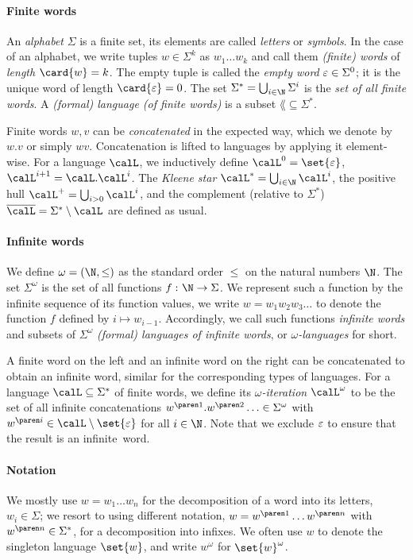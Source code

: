 \documentclass[../../diss.tex]{subfiles}
\begin{document}
\paragraph{Finite words}

An \emph{alphabet} $\Sigma$ is a finite set, its elements are called \emph{letters} or \emph{symbols}.
In the case of an alphabet, we write tuples $w \in \Sigma^k$ as $w_1 \ldots w_k$ and call them \emph{(finite) words} of \emph{length} $\card{w} = k$.
The empty tuple is called the \emph{empty word} $\varepsilon \in \Sigma^0$; it is the unique word of length $\card{\eps} = 0$.
The set $\Sigma^* = \bigcup_{i \in \N} \Sigma^i$ is the \emph{set of all finite words}.
A \emph{(formal) language (of finite words)} is a subset $\lang \subseteq \Sigma^*$.

%
Finite words $w,v$ can be \emph{concatenated} in the expected way, which we denote by $w.v$ or simply $wv$.
Concatenation is lifted to languages by applying it element-wise.
For a language $\calL$, we inductively define $\calL^0 = \set{\eps}$, $\calL^{i+1} = \calL.\calL^{i}$.
The \emph{Kleene star} $\calL^* = \bigcup_{i \in \N} \calL^i$, the positive hull $\calL^+ = \bigcup_{i > 0} \calL^i$, and the complement (relative to $\Sigma^*$) $\overline{\calL} = \Sigma^* \setminus \calL$ are defined as usual.

\paragraph{Infinite words}

We define $\omega = (\N,\leq)$ as the standard order $\leq$ on the natural numbers $\N$.
%
The set $\Sigma^\omega$ is the set of all functions $f \,\colon \N \to \Sigma$.
We represent such a function by the infinite sequence of its function values, \ie we write $w = w_1 w_2 w_3 \ldots$ to denote the function $f$ defined by $i \mapsto w_{i-1}$.
Accordingly, we call such functions \emph{infinite words} and subsets of $\Sigma^\omega$ \emph{(formal) languages of infinite words}, or \emph{$\omega$-languages} for short.

A finite word on the left and an infinite word on the right can be concatenated to obtain an infinite word, similar for the corresponding types of languages.
For a language $\calL \subseteq \Sigma^*$ of finite words, we define its \emph{$\omega$-iteration} $\calL^\omega$ to be the set of all infinite concatenations $\itr{w}{1}.\itr{w}{2}\ldots \in \Sigma^\omega$ with $\itr{w}{i} \in \calL \setminus \set{ \eps }$ for all $i \in \N$.
Note that we exclude $\varepsilon$ to ensure that the result is an infinite~word.
\paragraph{Notation}

We mostly use $w = w_1 \ldots w_n$ for the decomposition of a word into its letters, \ie $w_i \in \Sigma$; we resort to using different notation, \eg $w = \itr{w}{1} \ldots \itr{w}{n}$ with $\itr{w}{n} \in \Sigma^*$, for a decomposition into infixes.
We often use $w$ to denote the singleton language $\set{w}$, and write \eg $w^\omega$ for $\set{w}^\omega$.
\end{document}
